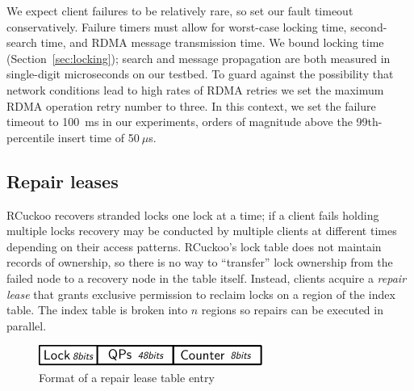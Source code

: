 We expect client failures to be relatively rare, so set
our fault timeout conservatively. Failure timers must allow for
worst-case locking time, second-search time, and RDMA message
transmission time. We bound locking time (Section~\ref{sec:locking});
search and message propagation are both measured in single-digit
microseconds on our testbed.  To guard against the possibility that
network conditions lead to high rates of RDMA retries we set
the maximum RDMA operation retry number to three.  In
this context, we set the failure timeout to 100~ms in our experiments,
orders of magnitude above the 99th-percentile insert time
of 50$~\mu$s.


\subsection{Repair leases}

RCuckoo recovers stranded locks one lock at a time; if a client fails
holding multiple locks recovery may be conducted by multiple clients
at different times depending on their access patterns.  RCuckoo's lock
table does not maintain records of ownership, so there is no way to
``transfer'' lock ownership from the failed node to a recovery node in
the table itself.  Instead, clients acquire a \emph{repair lease} that
grants exclusive permission to reclaim locks on a region of the index
table. The index table is broken into $n$ regions so repairs can be
executed in parallel.

\begin{figure}[t]
    \centering
        \includegraphics[width=0.99\linewidth]{fig/lease.pdf}
    \caption{Format of a repair lease table entry}
    \label{fig:lease}
   \vspace{-1em}
\end{figure}

